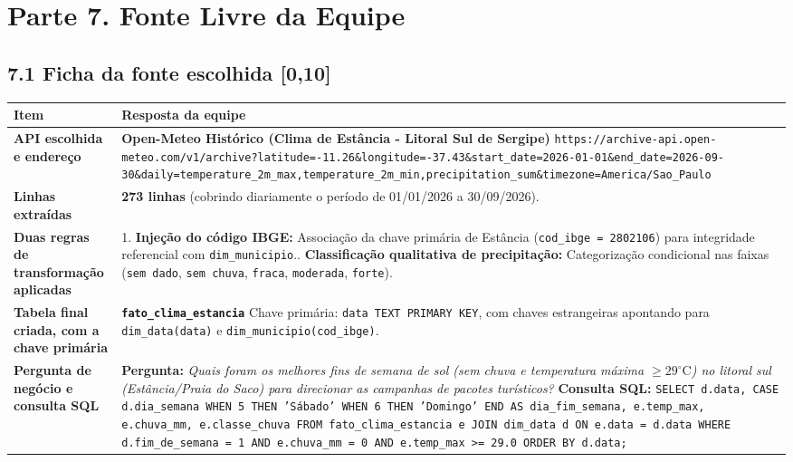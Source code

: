 \documentclass[11pt,a4paper]{article}
\begin{document}
\section*{Parte 7. Fonte Livre da Equipe}

\subsection*{7.1 Ficha da fonte escolhida \textnormal{[0,10]}}

\begin{table}[h!]
\centering
\small
\begin{tabularx}{\textwidth}{p{4.2cm} X}
\toprule
\textbf{Item} & \textbf{Resposta da equipe} \\
\midrule
\textbf{API escolhida e endereço} & \textbf{Open-Meteo Histórico (Clima de Estância - Litoral Sul de Sergipe)}\newline
\texttt{https://archive-api.open-meteo.com/v1/archive?latitude=-11.26\&longitude=-37.43\&start\_date=2026-01-01\&end\_date=2026-09-30\&daily=temperature\_2m\_max,temperature\_2m\_min,precipitation\_sum\&timezone=America/Sao\_Paulo} \\
\addlinespace
\textbf{Linhas extraídas} & \textbf{273 linhas} (cobrindo diariamente o período de 01/01/2026 a 30/09/2026). \\
\addlinespace
\textbf{Duas regras de transformação aplicadas} & 1. \textbf{Injeção do código IBGE:} Associação da chave primária de Estância (\texttt{cod\_ibge = 2802106}) para integridade referencial com \texttt{dim\_municipio}.\newline
2. \textbf{Classificação qualitativa de precipitação:} Categorização condicional nas faixas (\texttt{sem dado}, \texttt{sem chuva}, \texttt{fraca}, \texttt{moderada}, \texttt{forte}). \\
\addlinespace
\textbf{Tabela final criada, com a chave primária} & \textbf{\texttt{fato\_clima\_estancia}}\newline
Chave primária: \texttt{data TEXT PRIMARY KEY}, com chaves estrangeiras apontando para \texttt{dim\_data(data)} e \texttt{dim\_municipio(cod\_ibge)}. \\
\addlinespace
\textbf{Pergunta de negócio e consulta SQL} & \textbf{Pergunta:} \textit{Quais foram os melhores fins de semana de sol (sem chuva e temperatura máxima $\ge 29^\circ\text{C}$) no litoral sul (Estância/Praia do Saco) para direcionar as campanhas de pacotes turísticos?}\newline\newline
\textbf{Consulta SQL:}\newline
\texttt{SELECT d.data, CASE d.dia\_semana WHEN 5 THEN 'Sábado' WHEN 6 THEN 'Domingo' END AS dia\_fim\_semana, e.temp\_max, e.chuva\_mm, e.classe\_chuva FROM fato\_clima\_estancia e JOIN dim\_data d ON e.data = d.data WHERE d.fim\_de\_semana = 1 AND e.chuva\_mm = 0 AND e.temp\_max >= 29.0 ORDER BY d.data;} \\
\bottomrule
\end{tabularx}
\end{table}
\end{document}
